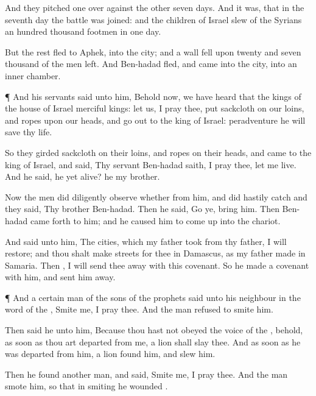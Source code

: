 {And they
pitched
one over
against the
other
seven
days. And
{} it was, that in the
seventh
day the
battle was
joined: and the
children of
Israel
slew of the
Syrians an
hundred
thousand
footmen in
one
day.

But the
rest
fled to
Aphek, into the
city; and
{} a
wall
fell upon
twenty and
seven
thousand of the
men
{}
left. And
Ben-hadad
fled, and
came into the
city, into an
inner
chamber.


\par }{\PP {}¶ And his
servants
said unto him, Behold now, we have
heard that the
kings of the
house of
Israel
{}
merciful
kings: let us, I pray thee,
put
sackcloth on our
loins, and
ropes upon our
heads, and go
out to the
king of
Israel: peradventure he will
save thy
life.

So they
girded
sackcloth on their
loins, and
{}
ropes on their
heads, and
came to the
king of
Israel, and
said, Thy
servant
Ben-hadad
saith, I pray thee, let me
live. And he
said,
{} he yet
alive? he
{} my
brother.

Now the
men did diligently
observe whether
{} from him, and did
hastily
catch
{} and they
said, Thy
brother
Ben-hadad. Then he
said,
Go ye,
bring him. Then
Ben-hadad came
forth to him; and he caused him to come
up into the
chariot.

And
{}
said unto him, The
cities, which my
father
took from thy
father, I will
restore; and thou shalt
make
streets for thee in
Damascus, as my
father
made in
Samaria. Then
{}, I will send thee
away with this
covenant. So he
made a
covenant with him, and sent him
away.


\par }{\PP {}¶ And a
certain
man of the
sons of the
prophets
said unto his
neighbour in the
word of the
{},
Smite me, I pray thee. And the
man
refused to
smite him.

Then
said he unto him, Because thou hast not
obeyed the
voice of the
{}, behold, as soon as thou art
departed from me, a
lion shall
slay thee. And as soon as he was
departed from
him, a
lion
found him, and
slew him.

Then he
found
another
man, and
said,
Smite me, I pray thee. And the
man
smote him, so that in
smiting he
wounded
{}.

}
